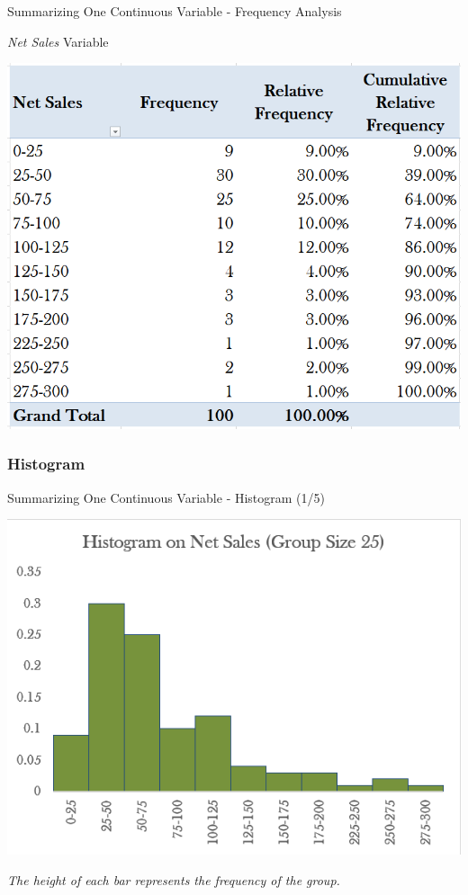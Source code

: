 \documentclass{beamer}
\begin{document}
\begin{frame}{Summarizing One Continuous Variable - Frequency Analysis}

\begin{center}
\textit{Net Sales} Variable
\vspace{0.25 cm}

\includegraphics[scale=0.4]{images/ch2ContinuousFrequencyTable.png}
\end{center}

\end{frame}

\subsubsection{Histogram}
\begin{frame}{Summarizing One Continuous Variable - Histogram (1/5)}

\begin{center}

\includegraphics[scale=0.5]{images/ch2Histogram.png}
\end{center}

\begin{center}
\textit{The height of each bar represents the frequency of the group.
}
\end{center}

\end{frame}
\end{document}
